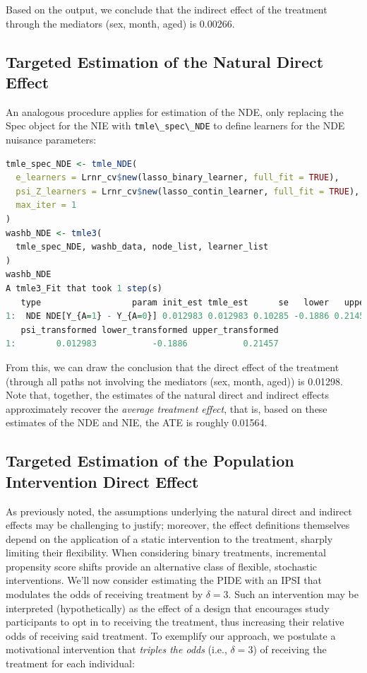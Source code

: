 \documentclass[
  12pt, krantz2,
]{krantz}
\newcommand{\passthrough}[1]{#1}
\newcommand{\1}{\mathbbm{1}}
\theoremstyle{definition}
\theoremstyle{definition}
\theoremstyle{definition}
\theoremstyle{definition}
\theoremstyle{remark}
\begin{document}
Based on the output, we conclude that the indirect effect of the treatment
through the mediators (sex, month, aged) is
0.00266.

\hypertarget{targeted-estimation-of-the-natural-direct-effect}{%
\subsection{Targeted Estimation of the Natural Direct Effect}\label{targeted-estimation-of-the-natural-direct-effect}}

An analogous procedure applies for estimation of the NDE, only replacing the
Spec object for the NIE with \passthrough{\lstinline!tmle\_spec\_NDE!} to define learners for the NDE
nuisance parameters:

\begin{lstlisting}[language=R]
tmle_spec_NDE <- tmle_NDE(
  e_learners = Lrnr_cv$new(lasso_binary_learner, full_fit = TRUE),
  psi_Z_learners = Lrnr_cv$new(lasso_contin_learner, full_fit = TRUE),
  max_iter = 1
)
washb_NDE <- tmle3(
  tmle_spec_NDE, washb_data, node_list, learner_list
)
washb_NDE
A tmle3_Fit that took 1 step(s)
   type                  param init_est tmle_est      se   lower   upper
1:  NDE NDE[Y_{A=1} - Y_{A=0}] 0.012983 0.012983 0.10285 -0.1886 0.21457
   psi_transformed lower_transformed upper_transformed
1:        0.012983           -0.1886           0.21457
\end{lstlisting}

From this, we can draw the conclusion that the direct effect of the treatment
(through all paths not involving the mediators (sex, month, aged)) is
0.01298. Note that, together, the estimates of
the natural direct and indirect effects approximately recover the \emph{average
treatment effect}, that is, based on these estimates of the NDE and NIE, the
ATE is roughly
0.01564.

\hypertarget{targeted-estimation-of-the-population-intervention-direct-effect}{%
\subsection{Targeted Estimation of the Population Intervention Direct Effect}\label{targeted-estimation-of-the-population-intervention-direct-effect}}

As previously noted, the assumptions underlying the natural direct and indirect
effects may be challenging to justify; moreover, the effect definitions
themselves depend on the application of a static intervention to the treatment,
sharply limiting their flexibility. When considering binary treatments,
incremental propensity score shifts provide an alternative class of flexible,
stochastic interventions. We'll now consider estimating the PIDE with an IPSI
that modulates the odds of receiving treatment by \(\delta = 3\). Such an
intervention may be interpreted (hypothetically) as the effect of a design that
encourages study participants to opt in to receiving the treatment, thus
increasing their relative odds of receiving said treatment. To exemplify our
approach, we postulate a motivational intervention that \emph{triples the odds}
(i.e., \(\delta = 3\)) of receiving the treatment for each individual:
\end{document}
